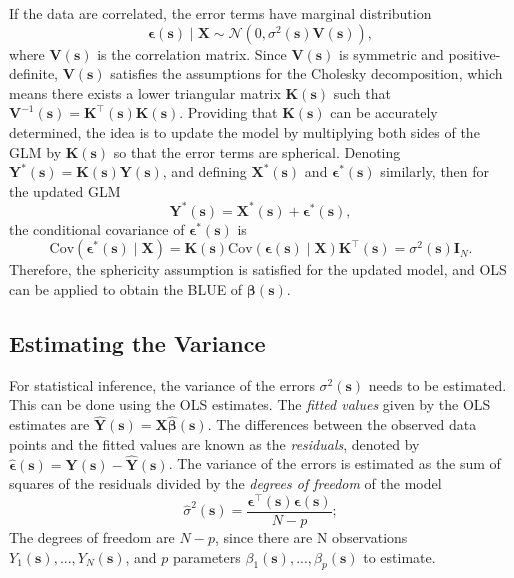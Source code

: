 If the data are correlated, the error terms have marginal distribution 
\begin{equation}
\label{eq:correlated_errors}
\bm{\epsilon}(\bm{s}) \mid \bm{X} \sim  \mathcal{N}(0, \sigma^{2}(\bm{s})\bm{V}(\bm{s})),
\end{equation}
where $\bm{V}(\bm{s})$ is the correlation matrix. Since $\bm{V}(\bm{s})$ is symmetric and positive-definite, $\bm{V}(\bm{s})$ satisfies the assumptions for the Cholesky decomposition, which means there exists a lower triangular matrix $\bm{K}(\bm{s})$ such that $\bm{V}^{-1}(\bm{s}) = \bm{K}^{\intercal}(\bm{s})\bm{K}(\bm{s})$. Providing that $\bm{K}(\bm{s})$ can be accurately determined, the idea is to update the model by multiplying both sides of the GLM by $\bm{K}(\bm{s})$ so that the error terms are spherical. Denoting $\bm{Y}^{*}(\bm{s}) = \bm{K}(\bm{s})\bm{Y}(\bm{s})$, and defining $\bm{X}^{*}(\bm{s})$ and $\bm{\epsilon}^{*}(\bm{s})$ similarly, then for the updated GLM
\begin{equation}
\label{eq:updated_GLM}
\bm{Y}^{*}(\bm{s}) = \bm{X}^{*}(\bm{s}) + \bm{\epsilon}^{*}(\bm{s}),
\end{equation}
the conditional covariance of $\bm{\epsilon}^{*}(\bm{s})$ is
\begin{equation}
\label{eq:updated_error_cov}
\mathrm{Cov}(\bm{\epsilon}^{*}(\bm{s}) \mid \bm{X}) = \bm{K}(\bm{s})\mathrm{Cov}(\bm{\epsilon}(\bm{s}) \mid \bm{X})\bm{K}^{\intercal}(\bm{s}) = \sigma^{2}(\bm{s})\bm{I}_{N}.
\end{equation}
Therefore, the sphericity assumption is satisfied for the updated model, and OLS can be applied to obtain the BLUE of $\bm{\beta}(\bm{s})$.

\subsection{Estimating the Variance}
For statistical inference, the variance of the errors $\sigma^{2}(\bm{s})$ needs to be estimated. This can be done using the OLS estimates. The \textit{fitted values} given by the OLS estimates are $\hat{\bm{Y}}(\bm{s}) = \bm{X}\hat{\bm{\beta}}(\bm{s})$. The differences between the observed data points and the fitted values are known as the \textit{residuals}, denoted by $\hat{\bm{\epsilon}}(\bm{s}) = \bm{Y}(\bm{s}) - \hat{\bm{Y}}(\bm{s})$. The variance of the errors is estimated as the sum of squares of the residuals divided by the \textit{degrees of freedom} of the model
\begin{equation}
\label{eq:variance_estimator}
\hat{\sigma}^{2}(\bm{s}) = \frac{\bm{\epsilon^{\intercal}}(\bm{s})\bm{\epsilon}(\bm{s})}{N - p};
\end{equation}
The degrees of freedom are $N - p$, since there are N observations $Y_{1}(\bm{s}), ..., Y_{N}(\bm{s})$, and $p$ parameters $\beta_{1}(\bm{s}), ... , \beta_{p}(\bm{s})$ to estimate.

